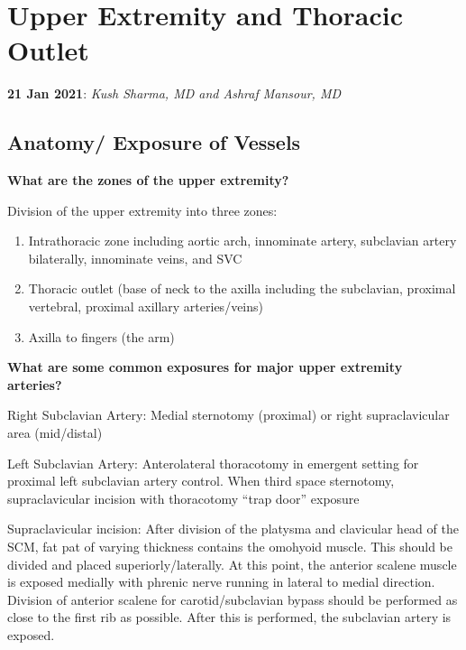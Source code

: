\documentclass[
]{book}
\begin{document}
\hypertarget{upper-extremity-and-thoracic-outlet}{%
\chapter{Upper Extremity and Thoracic Outlet}\label{upper-extremity-and-thoracic-outlet}}

\textbf{21 Jan 2021}: \emph{Kush Sharma, MD and Ashraf Mansour, MD}

\hypertarget{anatomy-exposure-of-vessels}{%
\section{Anatomy/ Exposure of Vessels}\label{anatomy-exposure-of-vessels}}

\textbf{What are the zones of the upper extremity?}
\citep{illig57UpperExtremity2019, illig57UpperExtremity2019}

Division of the upper extremity into three zones:

\begin{enumerate}
\def\labelenumi{\arabic{enumi}.}
\item
  Intrathoracic zone including aortic arch, innominate artery,
  subclavian artery bilaterally, innominate veins, and SVC
\item
  Thoracic outlet (base of neck to the axilla including the
  subclavian, proximal vertebral, proximal axillary arteries/veins)
\item
  Axilla to fingers (the arm)
\end{enumerate}

\textbf{What are some common exposures for major upper extremity arteries?}

Right Subclavian Artery: Medial sternotomy (proximal) or right
supraclavicular area (mid/distal)

Left Subclavian Artery: Anterolateral thoracotomy in emergent setting
for proximal left subclavian artery control. When third space
sternotomy, supraclavicular incision with thoracotomy ``trap door''
exposure

Supraclavicular incision: After division of the platysma and clavicular
head of the SCM, fat pat of varying thickness contains the omohyoid
muscle. This should be divided and placed superiorly/laterally. At this
point, the anterior scalene muscle is exposed medially with phrenic
nerve running in lateral to medial direction. Division of anterior
scalene for carotid/subclavian bypass should be performed as close to
the first rib as possible. After this is performed, the subclavian
artery is exposed.
\end{document}
